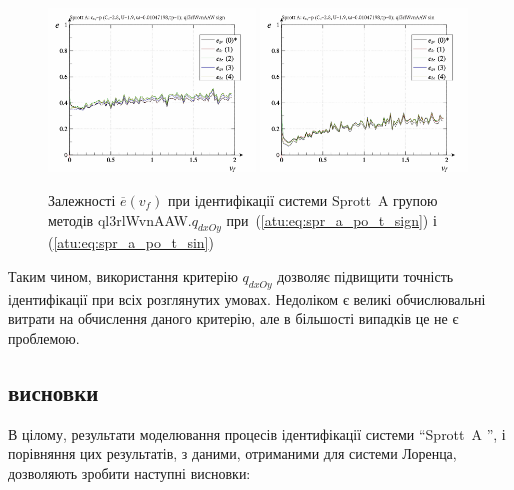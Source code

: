 \begin{figure}[htb!]
  \centerline{
    \includegraphics[width=0.49\textwidth]{p/cha/spr_a/ql3rlWvnAAW_dxOy/sprott_a_id2-p_v_f_sign.png}
    \hfill
    \includegraphics[width=0.49\textwidth]{p/cha/spr_a/ql3rlWvnAAW_dxOy/sprott_a_id2-p_v_f_sin.png}
  }
\caption{Залежності $ \overline{e} (v_f) $ при ідентифікації системи Sprott~A групою методів ql3rlWvnAAW.$q_{dxOy} $ при~(\ref{atu:eq:spr_a_po_t_sign}) і (\ref{atu:eq:spr_a_po_t_sin})}
  \label{atu:f:spr_a_v_f_ql3rlWvnAAW_q_dxOy}
\end{figure}

Таким чином, використання критерію
$ q_{dxOy} $ дозволяє підвищити точність ідентифікації при всіх
розглянутих умовах. Недоліком є великі обчислювальні витрати
на обчислення даного критерію, але в більшості випадків це не
є проблемою.



\subsection{висновки}%

В цілому, результати моделювання процесів ідентифікації системи
``Sprott~A '', і порівняння цих результатів, з даними, отриманими для
системи Лоренца, дозволяють зробити наступні висновки:

